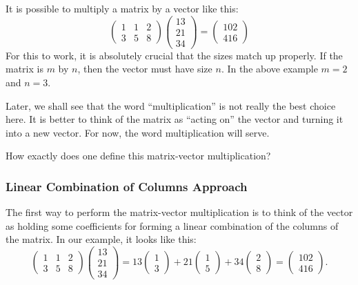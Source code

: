 \documentclass[11pt]{amsart}
\theoremstyle{definition}
\begin{document}
It is possible to multiply a matrix by a vector like this:
\[
\begin{pmatrix} 1 & 1 & 2 \\ 3 & 5 & 8 \end{pmatrix} \begin{pmatrix} 13 \\ 21 \\ 34 \end{pmatrix} = \begin{pmatrix} 102 \\ 416 \end{pmatrix}
\]
For this to work, it is absolutely crucial that the sizes match up properly. If the matrix is $m$ by $n$, then the vector must have size $n$. In the above example $m = 2$ and $n=3$.

Later, we shall see that the word ``multiplication'' is not really the best choice here. It is better to think of the matrix as ``acting on'' the vector and turning it into a new vector. For now, the word multiplication will serve.

How exactly does one define this matrix-vector multiplication?

\subsubsection{Linear Combination of Columns Approach}
The first way to perform the matrix-vector multiplication is to think of the vector as holding some coefficients for forming a linear combination of the columns of the matrix.
In our example, it looks like this:
\[
\begin{pmatrix} 1 & 1 & 2 \\ 3 & 5 & 8 \end{pmatrix} \begin{pmatrix} 13 \\ 21 \\ 34 \end{pmatrix} =
13 \begin{pmatrix} 1 \\ 3 \end{pmatrix} + 21 \begin{pmatrix} 1 \\ 5 \end{pmatrix} + 34 \begin{pmatrix} 2 \\ 8 \end{pmatrix} =
\begin{pmatrix} 102 \\ 416 \end{pmatrix} .
\]
\end{document}
